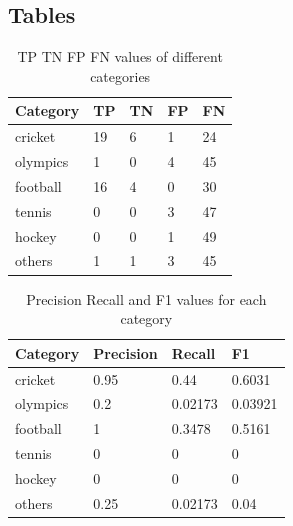 \documentclass[12pt]{article}
\begin{document}
\subsection{Tables}


\begin{center}
\begin{table}
\begin{tabular}{ |p{3.0cm}|p{3.0cm}| p{3.0cm} | p{3.0cm} |p{3.0cm}| }\hline
\textbf{Category} & \textbf{TP} & \textbf{TN} & \textbf{FP} & \textbf{FN} \\\hline
cricket & 19 & 6 & 1 & 24 \\\hline			
olympics & 1 & 0 & 4 & 45 \\\hline			
football & 16 & 4 & 0 & 30	\\\hline		
tennis  & 0 & 0 & 3 & 47 \\\hline			
hockey  & 0 & 0 & 1 & 49 \\\hline			
others & 1 & 1 & 3 & 45	\\\hline		




\end{tabular}
\caption{TP TN FP FN values of different categories}
\end{table}
\end{center}



\begin{center}
\begin{table}
\small
\begin{tabular}{ | p{3.0cm} | p{2.0cm} |p{2.0cm} | p{2.0cm} | }\hline
\textbf{Category} & \textbf{Precision} & \textbf{Recall} & \textbf{F1} \\\hline
cricket & 0.95  &  0.44  & 0.6031 \\\hline			
olympics & 0.2  &  0.02173  & 0.03921 \\\hline			
football & 1  &  0.3478  & 0.5161 \\\hline			
tennis  & 0  &  0  & 0	\\\hline		
hockey  & 0  &  0  & 0	\\\hline		
others & 0.25  &  0.02173  & 0.04 \\\hline			

\end{tabular}
\caption{Precision Recall and F1 values for each category}
\end{table}
\end{center}




\newpage











\cite{*}
\end{document}
